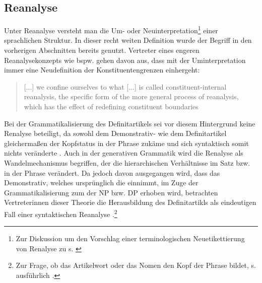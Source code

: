 \subsection{Reanalyse}\label{sec:reanalyse}

Unter Reanalyse versteht man die Um- oder Neuinterpretation\footnote{Zur Diskussion um den Vorschlag einer terminologischen Neuetikettierung von Renalyse zu  s.  \textcite[36]{Traugott2013}} einer sprachlichen Struktur. In dieser recht weiten Definition wurde der Begriff in den vorherigen Abschnitten bereits genutzt. Vertreter eines engeren Reanalysekonzepts wie bspw. \textcite[215]{Heine1991} gehen davon aus, dass mit der Uminterpretation immer eine Neudefinition der Konstituentengrenzen einhergeht: \blockcquote[216]{Heine1991}{[...] we confine ourselves to what [...] is called constituent-internal reanalysis, the specific form of the more general process of reanalysis, which has the effect of redefining constituent boundaries}. Bei der Grammatikalisierung des Definitartikels sei vor diesem Hintergrund keine Renalyse  beteiligt, da sowohl dem Demonstrativ- wie dem Definitartikel gleichermaßen der Kopfstatus in der Phrase zukäme und sich syntaktisch somit nichts veränderte \parencite[219]{Heine1991}. Auch in der generativen Grammatik wird die Renalyse als Wandelmechanismus begriffen, der die hierarchischen Verhältnisse im Satz bzw. in der Phrase verändert. Da jedoch davon ausgegangen wird, dass das Demonstrativ, welches ursprünglich die  einnimmt, im Zuge der Grammatikalisierung zum  der NP bzw. DP erhoben wird, betrachten Vertreterinnen dieser Theorie die Herausbildung des Definitartikls als eindeutigen Fall einer syntaktischen Reanalyse \parencite[vgl. bspw.][]{Philippi1997,vanGelderen2007}.\footnote{Zur Frage, ob das Artikelwort oder das Nomen den Kopf der Phrase bildet, s. ausführlich \textcite[145f.]{Himmelmann1997}.}

